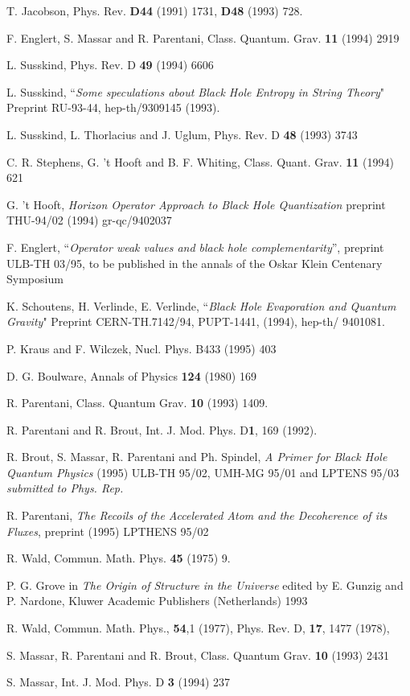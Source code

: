 \documentclass[12pt]{article}
\begin{document}
\begin{thebibliography}{99}
 T. Jacobson, Phys. Rev.
 {\bf D44} (1991) 1731, {\bf D48} (1993) 728.


F. Englert, S. Massar and R. Parentani,
 Class. Quantum. Grav. {\bf 11} (1994) 2919

 L. Susskind, Phys. Rev. D {\bf 49} (1994) 6606


 L. Susskind,
``{\it Some speculations about Black Hole Entropy in String Theory}"
Preprint RU-93-44, hep-th/9309145 (1993).

 L. Susskind, L. Thorlacius  and J. Uglum, Phys. Rev. D {\bf 48}
(1993) 3743

C. R. Stephens, G. 't Hooft and B. F. Whiting,
Class. Quant. Grav. {\bf 11} (1994) 621

G. 't Hooft,
{\em Horizon Operator Approach to Black Hole Quantization}
preprint THU-94/02 (1994) gr-qc/9402037

F. Englert, ``{\it Operator weak values and black hole
complementarity}'', preprint ULB-TH 03/95, to be published in the annals of
the Oskar Klein Centenary Symposium

 K. Schoutens, H. Verlinde,
 E. Verlinde, ``{\it Black Hole Evaporation and Quantum Gravity}"
Preprint CERN-TH.7142/94, PUPT-1441, (1994), hep-th/ 9401081.

 P. Kraus and F. Wilczek,
Nucl. Phys. B433 (1995) 403

D. G. Boulware, Annals of Physics {\bf 124} (1980) 169

 R. Parentani,
  Class. Quantum Grav. {\bf 10} (1993) 1409.

R. Parentani and R. Brout, Int. J. Mod. Phys. D{\bf 1}, 169
(1992).

 R. Brout, S. Massar, R. Parentani and Ph. Spindel, {\em A
Primer for Black Hole Quantum Physics} (1995) ULB-TH 95/02, UMH-MG 95/01 and
LPTENS 95/03 {\em submitted to Phys. Rep.}

R. Parentani, {\em The Recoils of the Accelerated Atom
and the Decoherence of its Fluxes}, preprint (1995) LPTHENS 95/02

 R. Wald, Commun. Math. Phys. {\bf 45} (1975) 9.

 P. G. Grove
in {\it The Origin of Structure in the Universe} edited by E.
Gunzig and P. Nardone, Kluwer Academic Publishers (Netherlands) 1993

 R. Wald, Commun. Math. Phys., {\bf 54},1 (1977),
Phys. Rev. D, {\bf 17}, 1477 (1978),

 S. Massar, R. Parentani and R. Brout, Class. Quantum
Grav. {\bf 10} (1993) 2431

 S. Massar, Int. J. Mod. Phys. D {\bf 3} (1994) 237

\end{thebibliography}
\end{document}
